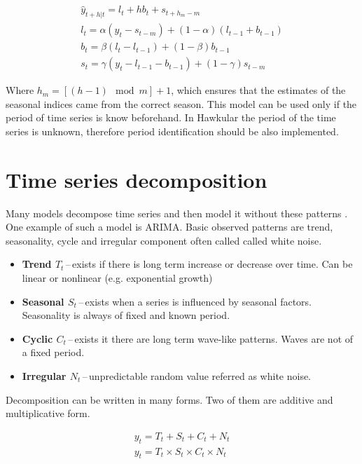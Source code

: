     \begin{eqnarray} \label{exp_holt_winters}
        \hat{y}_{t+h|t} = l_{t} + hb_{t} + s_{t+h_m-m}\\ \nonumber
        l_t = \alpha (y_t - s_{t-m}) + (1 - \alpha) (l_{t-1} + b_{t-1}) \\ \nonumber
        b_t = \beta (l_t - l_{t-1}) + (1 - \beta)b_{t-1} \\ \nonumber
        s_t = \gamma (y_t - l_{t-1} - b_{t-1}) + (1-\gamma)s_{t-m}
    \end{eqnarray}

    Where $h_m=[(h-1) \mod m] + 1$, which ensures that the estimates of the seasonal
    indices came from the correct season. This model can be used only if the period 
    of time series is know beforehand. In Hawkular the period of the time series is 
    unknown, therefore period identification should be also implemented.
    
    \section{Time series decomposition}
    Many models decompose time series and then model it without these patterns
    \cite{otexts}. One example of such a model is ARIMA.
    Basic observed patterns are trend, seasonality, cycle and irregular
    component often called called white noise. 
    
    \begin{itemize}
        \item \textbf{Trend $ T_{t} $}\,--\,exists if there is long term increase or decrease over
            time. Can be linear or nonlinear (e.g. exponential growth)
        \item \textbf{Seasonal $ S_{t} $}\,--\,exists when a series is influenced by seasonal factors.
            Seasonality is always of fixed and known period.
        \item \textbf{Cyclic $ C_{t} $}\,--\,exists it there are long term wave-like patterns.
            Waves are not of a fixed period.
        \item \textbf{Irregular $ N_{t} $}\,--\,unpredictable random value referred as white
            noise. 
    \end{itemize}

    Decomposition can be written in many forms. Two of them are additive and
    multiplicative form.

    \begin{eqnarray}
        y_{t} = T_{t} + S_{t} + C_{t} + N_{t} \\
        y_{t} = T_{t} \times S_{t} \times C_{t} \times N_{t} 
    \end{eqnarray}

